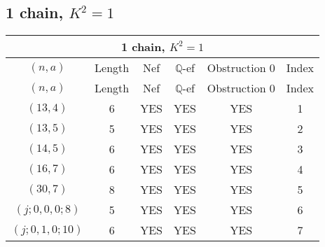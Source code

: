 \subsection{1 chain, $K^2 = 1$}
\begin{longtable}{|c|c|c|c|c|c|}
\hline
\multicolumn{6}{|c|}{1 chain, $K^2 = 1$}\\
\hline
$(n,a)$ & Length & Nef & $\mathbb Q$-ef & Obstruction 0 & Index\\
\hline
\endfirsthead

\hline
$(n,a)$ & Length & Nef & $\mathbb Q$-ef & Obstruction 0 & Index\\
\hline
\endhead
\hline
\endfoot

$(13, 4)$ & 6 & YES & YES & YES & 1\\
$(13, 5)$ & 5 & YES & YES & YES & 2\\
$(14, 5)$ & 6 & YES & YES & YES & 3\\
$(16, 7)$ & 6 & YES & YES & YES & 4\\
$(30, 7)$ & 8 & YES & YES & YES & 5\\
$(j; 0, 0, 0; 8)$ & 5 & YES & YES & YES & 6\\
$(j; 0, 1, 0; 10)$ & 6 & YES & YES & YES & 7
\end{longtable}
